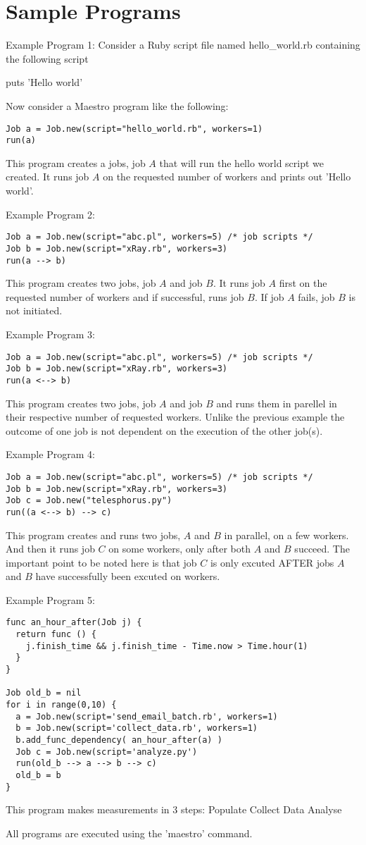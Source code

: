 \section{Sample Programs}
\label{sect:samples}
Example Program 1:
Consider a Ruby script file named hello_world.rb containing the following script

puts 'Hello world'

Now consider a Maestro program like the following:
\begin{lstlisting}
Job a = Job.new(script="hello_world.rb", workers=1)
run(a)
\end{lstlisting}
This program creates a jobs, job $A$ that will run the hello world script we created. 
It runs job $A$ on the requested number of workers and prints out 'Hello world'.


Example Program 2:
\begin{lstlisting}
Job a = Job.new(script="abc.pl", workers=5) /* job scripts */
Job b = Job.new(script="xRay.rb", workers=3)
run(a --> b)
\end{lstlisting}
This program creates two jobs, job $A$ and job $B$. It runs job $A$ first on the requested number of workers
and if successful, runs job $B$. If job $A$ fails, job $B$ is not initiated.

Example Program 3:
\begin{lstlisting}
Job a = Job.new(script="abc.pl", workers=5) /* job scripts */
Job b = Job.new(script="xRay.rb", workers=3)
run(a <--> b)
\end{lstlisting}
This program creates two jobs, job $A$ and job $B$ and runs them in parellel in their respective number of requested workers.
Unlike the previous example the outcome of one job is not dependent on the execution of the other job(s).

Example Program 4: 
\begin{lstlisting}
Job a = Job.new(script="abc.pl", workers=5) /* job scripts */
Job b = Job.new(script="xRay.rb", workers=3)
Job c = Job.new("telesphorus.py")
run((a <--> b) --> c)
\end{lstlisting}
This program creates and runs two jobs, $A$ and $B$ in parallel, on a few
workers. And then it runs job $C$ on some workers, only after both $A$
and $B$ succeed. The important point to be noted here is that job $C$ is 
only excuted AFTER jobs $A$ and $B$ have successfully been excuted on workers.

Example Program 5:
\begin{lstlisting}
func an_hour_after(Job j) {
  return func () {
    j.finish_time && j.finish_time - Time.now > Time.hour(1)
  }
}

Job old_b = nil
for i in range(0,10) {
  a = Job.new(script='send_email_batch.rb', workers=1)
  b = Job.new(script='collect_data.rb', workers=1)
  b.add_func_dependency( an_hour_after(a) )
  Job c = Job.new(script='analyze.py')
  run(old_b --> a --> b --> c)
  old_b = b
}
\end{lstlisting}
This program makes measurements in 3 steps:
Populate
Collect Data
Analyse


All programs are executed using the 'maestro' command.
